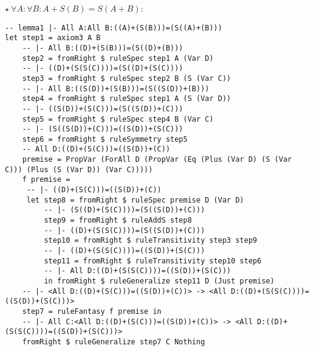 \documentclass{article}
\begin{document}
\begin{minipage}[t]{0.53\textwidth}
$\star \ \forall A: \forall B: A + S(B) = S(A + B)$:

\begin{lstlisting}
-- lemma1 |- All A:All B:((A)+(S(B)))=(S((A)+(B)))
let step1 = axiom3 A B
    -- |- All B:((D)+(S(B)))=(S((D)+(B)))
    step2 = fromRight $ ruleSpec step1 A (Var D)
    -- |- ((D)+(S(S(C))))=(S((D)+(S(C))))
    step3 = fromRight $ ruleSpec step2 B (S (Var C))
    -- |- All B:((S(D))+(S(B)))=(S((S(D))+(B)))
    step4 = fromRight $ ruleSpec step1 A (S (Var D))
    -- |- ((S(D))+(S(C)))=(S((S(D))+(C)))
    step5 = fromRight $ ruleSpec step4 B (Var C)
    -- |- (S((S(D))+(C)))=((S(D))+(S(C)))
    step6 = fromRight $ ruleSymmetry step5
    -- All D:((D)+(S(C)))=((S(D))+(C))
    premise = PropVar (ForAll D (PropVar (Eq (Plus (Var D) (S (Var C))) (Plus (S (Var D)) (Var C)))))
    f premise =
     -- |- ((D)+(S(C)))=((S(D))+(C))
     let step8 = fromRight $ ruleSpec premise D (Var D)
         -- |- (S((D)+(S(C))))=(S((S(D))+(C)))
         step9 = fromRight $ ruleAddS step8
         -- |- ((D)+(S(S(C))))=(S((S(D))+(C)))
         step10 = fromRight $ ruleTransitivity step3 step9
         -- |- ((D)+(S(S(C))))=((S(D))+(S(C)))
         step11 = fromRight $ ruleTransitivity step10 step6
         -- |- All D:((D)+(S(S(C))))=((S(D))+(S(C)))
         in fromRight $ ruleGeneralize step11 D (Just premise)
    -- |- <All D:((D)+(S(C)))=((S(D))+(C))> -> <All D:((D)+(S(S(C))))=((S(D))+(S(C)))>
    step7 = ruleFantasy f premise in
    -- |- All C:<All D:((D)+(S(C)))=((S(D))+(C))> -> <All D:((D)+(S(S(C))))=((S(D))+(S(C)))>
    fromRight $ ruleGeneralize step7 C Nothing
\end{lstlisting}
\end{minipage}
\end{document}
